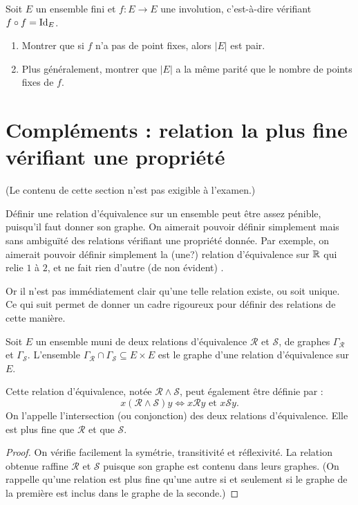 \begin{exercice}
Soit $E$ un ensemble fini et $f : E\to E$ une involution, c'est-à-dire vérifiant $f\circ f = \operatorname{Id}_E$.
\begin{enumerate}
\item Montrer que si $f$ n'a pas de point fixes, alors $|E|$ est pair.
\item Plus généralement, montrer que $|E|$ a la même parité que le nombre de points fixes de $f$.
\end{enumerate}
\end{exercice}
















\section{Compléments : relation la plus fine vérifiant une propriété}

(Le contenu de cette section n'est pas exigible à l'examen.)

\begin{mdframed}[linewidth=2]
Définir une relation d'équivalence sur un ensemble peut être assez pénible, puisqu'il faut donner son graphe. On aimerait pouvoir définir simplement mais sans ambiguïté des relations vérifiant une propriété donnée. Par exemple, on aimerait pouvoir définir simplement la (une?) relation d'équivalence sur $\mathbb{R}$ qui relie $1$ à $2$, et ne fait \og rien d'autre (de non évident) \fg. 

Or il n'est pas immédiatement clair qu'une telle relation existe, ou soit unique. Ce qui suit permet de donner un cadre rigoureux pour définir des relations de cette manière.
\end{mdframed}

\begin{propdef}
Soit $E$ un ensemble muni de deux relations d'équivalence $\mathcal R$ et $\mathcal S$, de graphes $\Gamma_{\mathcal R}$ et $\Gamma_{\mathcal S}$. L'ensemble $\Gamma_{\mathcal R} \cap \Gamma_{\mathcal S} \subseteq E\times E$ est le graphe d'une relation d'équivalence sur $E$. 

 Cette relation d'équivalence, notée $\mathcal R \wedge \mathcal S$, peut également être  définie par
:
\[x (\mathcal R \wedge \mathcal S) y \iff x\mathcal R y \text{ et } x\mathcal S y.
\]
On l'appelle l'intersection (ou conjonction) des deux relations d'équivalence. Elle est plus fine que $\mathcal R$ et que $\mathcal S$.
\end{propdef}
\begin{proof}
On vérifie facilement la symétrie, transitivité et réflexivité. La relation obtenue raffine $\mathcal R$ et $\mathcal S$ puisque son graphe est contenu dans leurs graphes. (On rappelle qu'une relation est plus fine qu'une autre si et seulement si le graphe de la première est inclus dans le graphe de la seconde.)
\end{proof}

